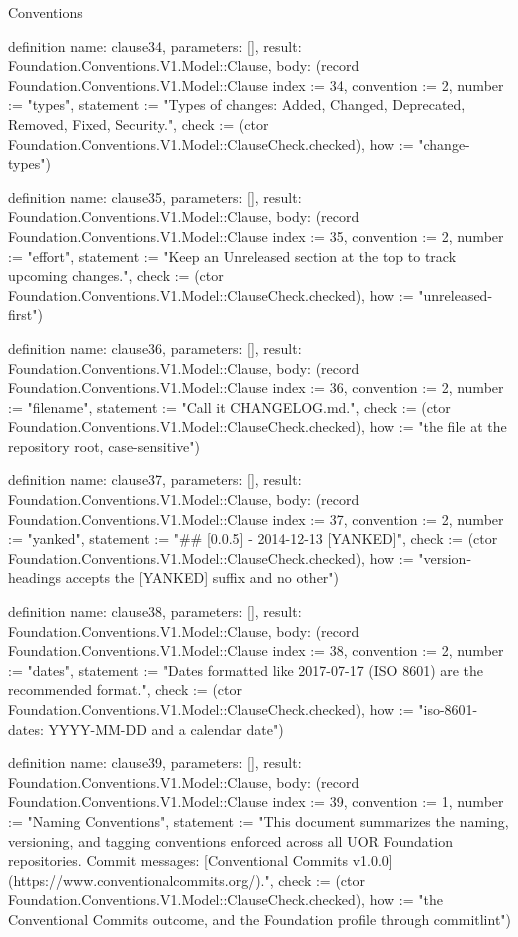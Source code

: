 \begin{lexlean}{Conventions}
\begin{semanticmodule}
definition{
  name: clause34,
  parameters: [],
  result: Foundation.Conventions.V1.Model::Clause,
  body: (record Foundation.Conventions.V1.Model::Clause {index := 34, convention := 2, number := "types", statement := "Types of changes: Added, Changed, Deprecated, Removed, Fixed, Security.", check := (ctor Foundation.Conventions.V1.Model::ClauseCheck.checked), how := "change-types"})
}

definition{
  name: clause35,
  parameters: [],
  result: Foundation.Conventions.V1.Model::Clause,
  body: (record Foundation.Conventions.V1.Model::Clause {index := 35, convention := 2, number := "effort", statement := "Keep an Unreleased section at the top to track upcoming changes.", check := (ctor Foundation.Conventions.V1.Model::ClauseCheck.checked), how := "unreleased-first"})
}

definition{
  name: clause36,
  parameters: [],
  result: Foundation.Conventions.V1.Model::Clause,
  body: (record Foundation.Conventions.V1.Model::Clause {index := 36, convention := 2, number := "filename", statement := "Call it CHANGELOG.md.", check := (ctor Foundation.Conventions.V1.Model::ClauseCheck.checked), how := "the file at the repository root, case-sensitive"})
}

definition{
  name: clause37,
  parameters: [],
  result: Foundation.Conventions.V1.Model::Clause,
  body: (record Foundation.Conventions.V1.Model::Clause {index := 37, convention := 2, number := "yanked", statement := "## [0.0.5] - 2014-12-13 [YANKED]", check := (ctor Foundation.Conventions.V1.Model::ClauseCheck.checked), how := "version-headings accepts the [YANKED] suffix and no other"})
}

definition{
  name: clause38,
  parameters: [],
  result: Foundation.Conventions.V1.Model::Clause,
  body: (record Foundation.Conventions.V1.Model::Clause {index := 38, convention := 2, number := "dates", statement := "Dates formatted like 2017-07-17 (ISO 8601) are the recommended format.", check := (ctor Foundation.Conventions.V1.Model::ClauseCheck.checked), how := "iso-8601-dates: YYYY-MM-DD and a calendar date"})
}

definition{
  name: clause39,
  parameters: [],
  result: Foundation.Conventions.V1.Model::Clause,
  body: (record Foundation.Conventions.V1.Model::Clause {index := 39, convention := 1, number := "Naming Conventions", statement := "This document summarizes the naming, versioning, and tagging conventions enforced across all UOR Foundation repositories. Commit messages: [Conventional Commits v1.0.0](https://www.conventionalcommits.org/).", check := (ctor Foundation.Conventions.V1.Model::ClauseCheck.checked), how := "the Conventional Commits outcome, and the Foundation profile through commitlint"})
}


\end{semanticmodule}
\end{lexlean}

